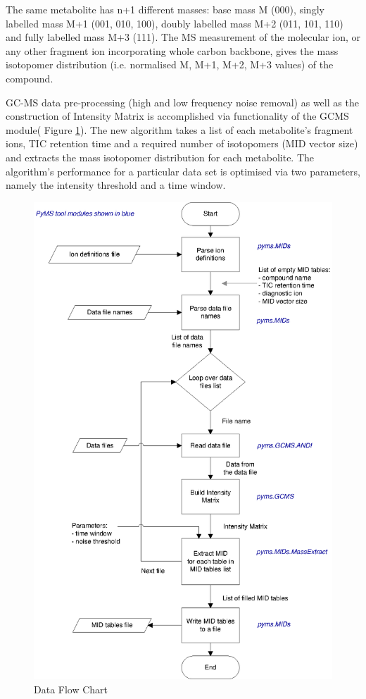 The same metabolite has n+1 different masses: base mass M (000), singly labelled
mass M+1 (001, 010, 100), doubly labelled mass M+2 (011, 101, 110) and fully 
labelled mass M+3 (111). The MS measurement of the molecular ion, or any other 
fragment ion incorporating whole carbon backbone,  gives the mass isotopomer 
distribution (i.e. normalised M, M+1, M+2, M+3 values) of the compound.

GC-MS data pre-processing (high and low frequency noise removal) as well as the 
construction of Intensity Matrix is accomplished via functionality of the GCMS 
module( Figure \ref{fig:81}). The new algorithm takes a list of each 
metabolite’s fragment ions, TIC retention time and a required number of 
isotopomers (MID vector size) and extracts the mass isotopomer distribution 
for each metabolite. The algorithm’s performance for a particular data set is 
optimised via two parameters, namely the intensity threshold and a time window.

\begin{figure}
  \begin{center}
    \includegraphics[scale=0.7]{graphics/chapter08/81.eps}
  \end{center}
  \caption{Data Flow Chart}
  \label{fig:81}
\end{figure}

